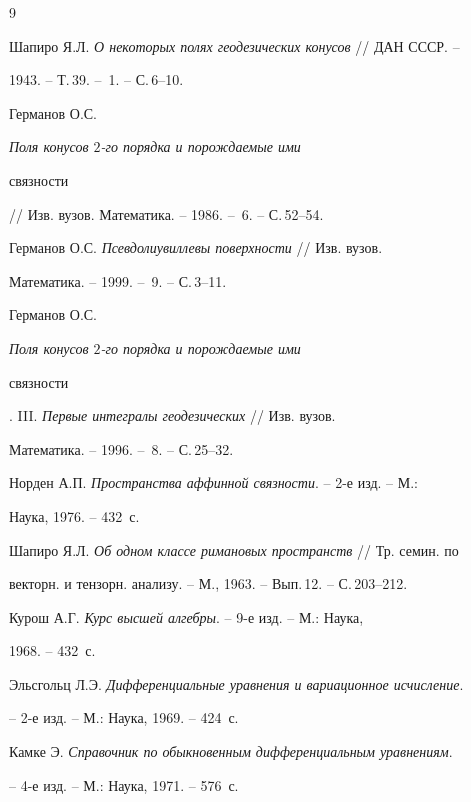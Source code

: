 \begin{thebibliography}{9} 


 




Шапиро Я.Л. {\em О некоторых полях геодезических конусов} // ДАН СССР. -- 


1943. -- Т.\,39. -- \No\,1. -- С.\,6--10. 




Германов О.С. {\em Поля конусов $2$-го порядка и порождаемые ими 


связности} // Изв. вузов. Математика. -- 1986. -- \No\,6. -- С.\,52--54. 




Германов О.С. {\em Псевдолиувиллевы поверхности} // Изв. вузов. 


Математика. -- 1999. -- \No\,9. -- С.\,3--11. 




Германов О.С. {\em Поля конусов $2$-го порядка и порождаемые ими 


связности}. III. {\em Первые интегралы геодезических} // Изв. вузов. 


Математика. -- 1996. -- \No\,8. -- С.\,25--32. 




Норден А.П. {\em Пространства аффинной связности}. -- 2-е изд. -- М.: 


Наука, 1976. -- 432~с. 




Шапиро Я.Л. {\em Об одном классе римановых пространств} // Тр. семин. по 


векторн. и тензорн. анализу. -- М., 1963. -- Вып.\,12. -- С.\,203--212. 




Курош А.Г. {\em Курс высшей алгебры}. -- 9-е изд. -- М.: Наука, 


1968. -- 432~с. 




Эльсгольц Л.Э. {\em Дифференциальные уравнения и вариационное исчисление}. 


-- 2-е изд. -- М.: Наука, 1969. -- 424~с. 




Камке Э. {\em Справочник по обыкновенным дифференциальным уравнениям}. 


-- 4-е изд. -- М.: Наука, 1971. -- 576~с. 


 


\end{thebibliography} 


 


\vskip 2cm 


 








 


\label{end} 


 


